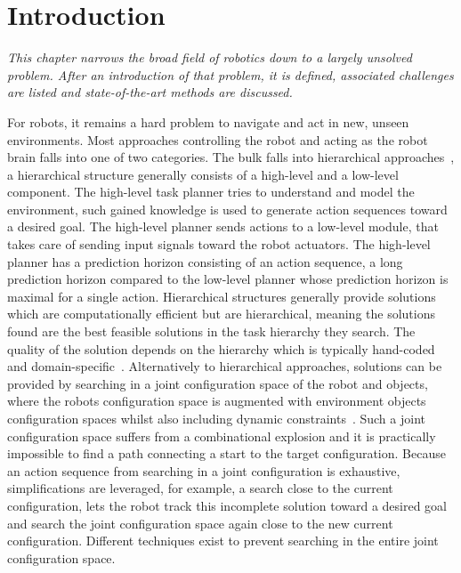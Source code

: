\chapter{Introduction}%
\label{chap:introduction}
\textit{
This chapter narrows the broad field of robotics down to a largely unsolved problem. After an introduction of that problem, it is defined, associated challenges are listed and state-of-the-art methods are discussed.\bs
}

For robots, it remains a hard problem to navigate and act in new, unseen environments. Most approaches controlling the robot and acting as the robot brain falls into one of two categories. The bulk falls into hierarchical approaches~\cite{kaelbling_hierarchical_2011,scholz_navigation_2016,krontiris_dealing_2015}, a hierarchical structure generally consists of a high-level and a low-level component. The high-level task planner tries to understand and model the environment, such gained knowledge is used to generate action sequences toward a desired goal. The high-level planner sends actions to a low-level module, that takes care of sending input signals toward the robot actuators. The high-level planner has a prediction horizon consisting of an action sequence, a long prediction horizon compared to the low-level planner whose prediction horizon is maximal for a single action. Hierarchical structures generally provide solutions which are computationally efficient but are hierarchical, meaning the solutions found are the best feasible solutions in the task hierarchy they search. The quality of the solution depends on the hierarchy which is typically hand-coded and domain-specific~\cite {vega-brown_asymptotically_2020}. Alternatively to hierarchical approaches, solutions can be provided by searching in a joint configuration space of the robot and objects, where the robots configuration space is augmented with environment objects configuration spaces whilst also including dynamic constraints~\cite{hauser_multimodal_2010,berenson_manipulation_2009,jaillet_path_2013}. Such a joint configuration space suffers from a combinational explosion and it is practically impossible to find a path connecting a start to the target configuration. Because an action sequence from searching in a joint configuration is exhaustive, simplifications are leveraged, for example, a search close to the current configuration, lets the robot track this incomplete solution toward a desired goal and search the joint configuration space again close to the new current configuration. Different techniques exist to prevent searching in the entire joint configuration space.\bs

